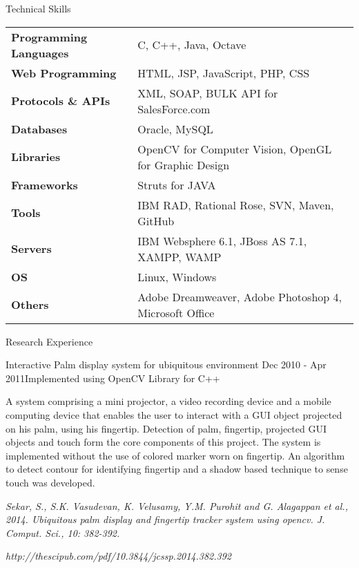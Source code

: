 \documentclass{resume} %
\begin{document}
\begin{rSection}{Technical Skills}

\begin{tabular}{ @{} >{\bfseries}l @{\hspace{6ex}} l }
Programming Languages & C, C++, Java, Octave \\
Web Programming & HTML, JSP, JavaScript, PHP, CSS \\
Protocols \& APIs & XML, SOAP, BULK API for SalesForce.com \\
Databases & Oracle, MySQL \\
Libraries & OpenCV for Computer Vision, OpenGL for Graphic Design \\
Frameworks & Struts for JAVA \\
Tools & IBM RAD, Rational Rose, SVN, Maven, GitHub \\
Servers & IBM Websphere 6.1, JBoss AS 7.1, XAMPP, WAMP \\
OS & Linux, Windows \\
Others & Adobe Dreamweaver, Adobe Photoshop 4, Microsoft Office
\end{tabular}

\end{rSection}


\begin{rSection}{Research Experience}

\begin{rSubsection}{Interactive Palm display system for ubiquitous environment }{Dec 2010 - Apr 2011}{Implemented using OpenCV Library for C++}
\item A system comprising a mini projector, a video recording device and a mobile computing device that enables the user to interact with a GUI object projected on his palm, using his fingertip. Detection of palm, fingertip, projected GUI objects and touch form the core components of this project. The system is implemented without the use of colored marker worn on fingertip. An algorithm to detect contour for identifying fingertip and a shadow based technique to sense touch was developed.

\item \textit{Sekar, S., S.K. Vasudevan, K. Velusamy, Y.M. Purohit and G. Alagappan et al., 2014. Ubiquitous palm display and fingertip tracker system using opencv. J. Comput. Sci., 10: 382-392.} 

\textit{http://thescipub.com/pdf/10.3844/jcssp.2014.382.392}

\end{rSubsection}



\end{rSection}
\end{document}
